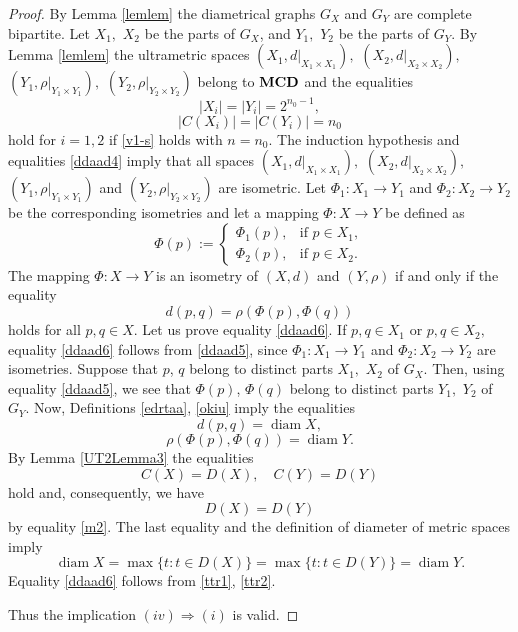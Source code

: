 \documentclass{raex}
\theoremstyle{definition}
\theoremstyle{remark}
\numberwithin{equation}{section}
\begin{document}
\begin{proof}
By Lemma \ref{lemlem} the diametrical graphs
$G_X$ and $G_Y$ are complete bipartite. Let $X_1,$ $X_2$ be the parts of
$G_X$, and $Y_1,$ $Y_2$ be the parts of $G_Y$. By Lemma \ref{lemlem} the
ultrametric spaces
\(
(X_1,d|_{X_1\times X_1}),\)
\((X_2,d|_{X_2\times X_2}),\)
\((Y_1,\rho|_{Y_1\times Y_1}),\)
\((Y_2,\rho|_{Y_2\times Y_2})
\)
belong to ${\bf MCD}$ and the equalities
\begin{equation*}
    |X_i|=|Y_i|=2^{n_0-1},
\end{equation*}
\begin{equation}
    \label{ddaad4}
    |C(X_i)|=|C(Y_i)|=n_0
\end{equation}
hold for $i=1,2$ if \eqref{v1-s} holds with $n=n_0$.
The induction hypothesis and equalities \eqref{ddaad4} imply that all spaces
\(
(X_1,d|_{X_1\times X_1}),
\)
\(
(X_2,d|_{X_2\times X_2}),
\)
\(
(Y_1,\rho|_{Y_1\times Y_1})
\) and \(
(Y_2,\rho|_{Y_2\times Y_2})
\)
are isometric. Let
\(
\Phi_1:X_1\to Y_1
\)
and
\(
\Phi_2:X_2\to Y_2
\)
be the corresponding isometries and let a mapping 
\(
\Phi:X\to Y
\)
be defined as
\begin{equation}
    \label{ddaad5}
\Phi(p):=
\begin{cases}
\Phi_1(p), & \text{if }p\in X_1,\\
\Phi_2(p), & \text{if }p\in X_2.
\end{cases}
\end{equation}
The mapping $\Phi:X\to Y$ is an isometry of $(X,d)$ and $(Y,\rho)$ if and only if the equality
\begin{equation}
    \label{ddaad6}
d(p,q)=\rho(\Phi(p),\Phi(q))
\end{equation}
holds for all $p,q\in X$.
Let us prove equality \eqref{ddaad6}. If
\(
p,q\in X_1 \) or
\( p,q\in X_2,
\)
equality \eqref{ddaad6} follows from \eqref{ddaad5}, since
\(
\Phi_1:X_1\to Y_1
\) and \(
\Phi_2:X_2\to Y_2
\)
are isometries. Suppose that $p$, $q$ belong to distinct parts $X_1,$ $X_2$
of $G_X$. Then, using  equality \eqref{ddaad5}, we see that
\(
\Phi(p)\), \(\Phi(q)
\)
belong to distinct parts $Y_1,$ $Y_2$ of $G_Y$. Now,
Definitions \ref{edrtaa}, \ref{okiu} imply the equalities 
\begin{equation}
    \label{ttr1}
d(p,q)=\operatorname{diam} X,
\end{equation}
\begin{equation}
    \label{ttr2}
\rho(\Phi(p),\Phi(q))
=\operatorname{diam} Y. 
\end{equation}
By Lemma \ref{UT2Lemma3} the equalities
\begin{equation*}
C(X)=D(X),\quad C(Y)=D(Y) 
\end{equation*}
hold and, consequently, we have
\begin{equation*}
    D(X)=D(Y)
\end{equation*}
by equality \eqref{m2}.
The last equality and the definition of diameter of metric spaces imply
\[
\operatorname{diam} X
=
\max\{t:t\in D(X)\}
=
\max\{t:t\in D(Y)\}
=
\operatorname{diam} Y.
\]
Equality \eqref{ddaad6} follows from \eqref{ttr1}, \eqref{ttr2}.

Thus the implication
\(
(iv)\Rightarrow(i)
\)
is valid.
\end{proof}
\end{document}
